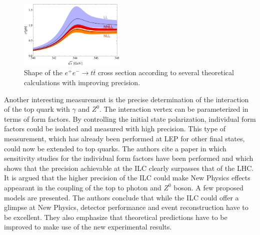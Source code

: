 \begin{figure}
  \includegraphics[width=0.45\textwidth]{./figures/TotCrossCombined.pdf}
  \caption{Shape of the $e^+e^-\to t\overline{t}$ cross section according to several theoretical calculations with improving precision.\cite{ilc}}
  \label{crosssection}
\end{figure}

Another interesting measurement is the precise determination of the interaction of the top quark with $γ$ and $Z^0$.
The interaction vertex can be parameterized in terms of form factors.
By controlling the initial state polarization, individual form factors could be isolated and measured with high precision.
This type of measurement, which has already been performed at LEP for other final states, could now be extended to top quarks.
The authors cite a paper\cite{study} in which sensitivity studies for the individual form factors have been performed and which shows that the precision achievable at the ILC clearly surpasses that of the LHC.
It is argued that the higher precision of the ILC could make New Physics effects appearant in the coupling of the top to photon and $Z^0$ boson.
A few proposed models are presented.
The authors conclude that while the ILC could offer a glimpse at New Physics, detector performance and event reconstruction have to be excellent.
They also emphasize that theoretical predictions have to be improved to make use of the new experimental results.

\nocite{*}
\printbibliography


